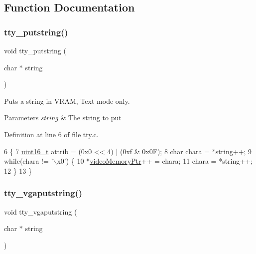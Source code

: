 \subsection{Function Documentation}
\mbox{\label{a00041_a2ebb962f457a2677d70285d1c0f9be12_a2ebb962f457a2677d70285d1c0f9be12}} 
\subsubsection{\texorpdfstring{tty\+\_\+putstring()}{tty\_putstring()}}
{\footnotesize\ttfamily void tty\+\_\+putstring (\begin{DoxyParamCaption}\item[{char $\ast$}]{string }\end{DoxyParamCaption})}



Puts a string in V\+R\+AM, Text mode only. 


\begin{DoxyParams}{Parameters}
{\em string} & The string to put \\
\hline
\end{DoxyParams}


Definition at line 6 of file tty.\+c.


\begin{DoxyCode}
6                                  \{
7     \hyperlink{a00035_a273cf69d639a59973b6019625df33e30_a273cf69d639a59973b6019625df33e30}{uint16\_t} attrib = (0x0 << 4) | (0xf & 0x0F);
8     \textcolor{keywordtype}{char} chara = *\textcolor{keywordtype}{string}++;
9     \textcolor{keywordflow}{while}(chara != \textcolor{stringliteral}{'\(\backslash\)x0'}) \{
10         *\hyperlink{a00041_a3f896e9c00b9302e2287aad054199134_a3f896e9c00b9302e2287aad054199134}{videoMemoryPtr}++ = chara;
11         chara = *\textcolor{keywordtype}{string}++;
12     \}
13 \}
\end{DoxyCode}
\mbox{\label{a00041_a13ff2c06d56753c5666ca56cb2d81100_a13ff2c06d56753c5666ca56cb2d81100}} 
\subsubsection{\texorpdfstring{tty\+\_\+vgaputstring()}{tty\_vgaputstring()}}
{\footnotesize\ttfamily void tty\+\_\+vgaputstring (\begin{DoxyParamCaption}\item[{char $\ast$}]{string }\end{DoxyParamCaption})}



